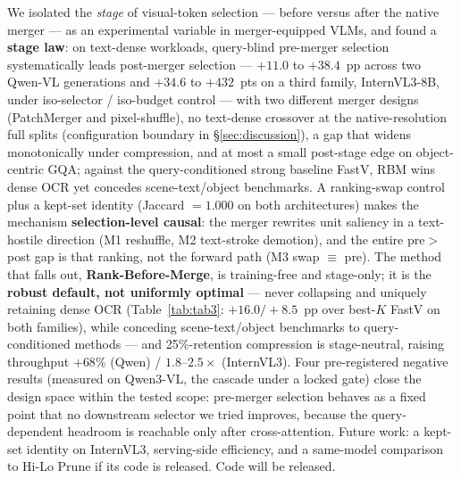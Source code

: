 \documentclass[sigconf,review,anonymous]{acmart}
\begin{document}
We isolated the \emph{stage} of visual-token selection --- before versus after
the native merger --- as an experimental variable in merger-equipped VLMs, and
found a \textbf{stage law}: on text-dense workloads, query-blind pre-merger
selection systematically leads post-merger selection --- $+11.0$ to $+38.4$~pp
across two Qwen-VL generations and $+34.6$ to $+432$~pts on a third family,
InternVL3-8B, under iso-selector / iso-budget control --- with two different
merger designs (PatchMerger and pixel-shuffle), no text-dense crossover at the
native-resolution full splits (configuration boundary in \S\ref{sec:discussion}),
a gap that widens monotonically under compression, and at most a small
post-stage edge on object-centric GQA; against the query-conditioned strong
baseline FastV, RBM wins dense OCR yet concedes scene-text/object benchmarks. A ranking-swap control plus a kept-set identity (Jaccard $= 1.000$
on both architectures) makes the mechanism \textbf{selection-level causal}: the
merger rewrites unit saliency in a text-hostile direction (M1 reshuffle, M2
text-stroke demotion), and the entire pre$>$post gap is that ranking, not the
forward path (M3 swap $\equiv$ pre). The method that falls out,
\textbf{Rank-Before-Merge}, is training-free and stage-only; it is the
\textbf{robust default, not uniformly optimal} --- never collapsing and uniquely
retaining dense OCR (Table~\ref{tab:tab3}: $+16.0 / +8.5$~pp over best-$K$ FastV
on both families), while conceding scene-text/object benchmarks to
query-conditioned methods --- and 25\%-retention compression is stage-neutral,
raising throughput $+68\%$ (Qwen) / $1.8$--$2.5\times$ (InternVL3). Four
pre-registered negative results (measured on Qwen3-VL, the cascade under a
locked gate) close the design space within the tested scope: pre-merger
selection behaves as a fixed point that no downstream selector we tried
improves, because the query-dependent headroom is reachable only after
cross-attention. Future work: a kept-set identity on InternVL3, serving-side
efficiency, and a same-model comparison to Hi-Lo Prune if its code is released.
Code will be released.



\end{document}
